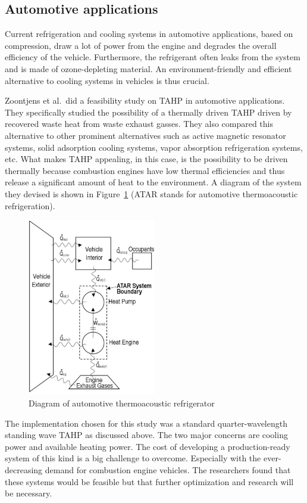 \documentclass[a4paper]{article}
\newcommand{\newpara}
    {
      \bigbreak{}
      \noindent
    }
\begin{document}
\subsection{Automotive applications}
Current refrigeration and cooling systems in automotive applications, based on compression, draw a lot of power from the engine and degrades the overall efficiency of the vehicle. Furthermore, the refrigerant often leaks from the system and is made of ozone-depleting material. An environment-friendly and efficient alternative to cooling systems in vehicles is thus crucial.
\newpara{}
Zoontjens et al.\ did a feasibility study on TAHP in automotive applications\cite{zoontjens2005feasibility}. They specifically studied the possibility of a thermally driven TAHP driven by recovered waste heat from waste exhaust gasses. They also compared this alternative to other prominent alternatives such as active magnetic resonator systems, solid adsorption cooling systems, vapor absorption refrigeration systems, etc.  What makes TAHP appealing, in this case, is the possibility to be driven thermally because combustion engines have low thermal efficiencies and thus release a significant amount of heat to the environment. A diagram of the system they devised is shown in Figure~\ref{automotiveDiagram} (ATAR stands for automotive thermoacoustic refrigeration).
\begin{figure}[h]
  \centering
  \includegraphics[width=0.5\textwidth]{images/automotive.png}
  \caption{Diagram of automotive thermoacoustic refrigerator\cite{zoontjens2005feasibility}}\label{automotiveDiagram}
\end{figure}
The implementation chosen for this study was a standard quarter-wavelength standing wave TAHP as discussed above. The two major concerns are cooling power and available heating power. The cost of developing a production-ready system of this kind is a big challenge to overcome. Especially with the ever-decreasing demand for combustion engine vehicles. The researchers found that these systems would be feasible but that further optimization and research will be necessary.
\end{document}
